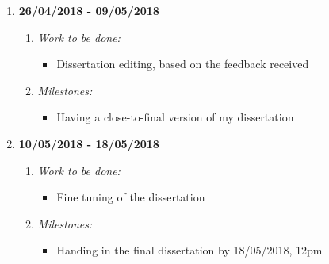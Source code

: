 \begin{enumerate}
	\vspace{5mm}
	
	\item \textbf{26/04/2018 - 09/05/2018}
		\begin{enumerate}
			\item \emph{Work to be done:}
			\begin{itemize}
				\item Dissertation editing, based on the feedback received
			\end{itemize}
			\item \emph{Milestones:}
			\begin{itemize}
				\item  Having a close-to-final version of my dissertation
			\end{itemize}
		\end{enumerate}	
	
	\vspace{5mm}
	
	\item \textbf{10/05/2018 - 18/05/2018}
	\begin{enumerate}
		\item \emph{Work to be done:}
		\begin{itemize}
			\item Fine tuning of the dissertation
		\end{itemize}
		\item \emph{Milestones:}
		\begin{itemize}
			\item  Handing in the final dissertation by 18/05/2018, 12pm
		\end{itemize}
	\end{enumerate}	
		
\end{enumerate}


